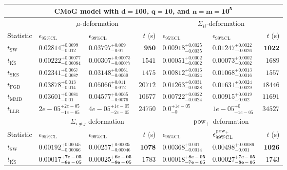 \begin{tabular}{l|llr|llr}
	\toprule
	\multicolumn{7}{c}{{\bf CMoG model with $\mathbf{d=100}$, $\mathbf{q=10}$, and $\mathbf{n=m=10^{5}}$}} \\
	\toprule
	\multicolumn{1}{c}{} & \multicolumn{3}{c}{$\mu$-deformation} & \multicolumn{3}{c}{$\Sigma_{ii}$-deformation} \\
	Statistic & $\epsilon_{95\%\mathrm{CL}}$ & $\epsilon_{99\%\mathrm    {CL}}$ & $t$ (s) & $\epsilon_{95\%\mathrm{CL}}$ & $\epsilon_{99\%\mathrm{CL}}$ & $t$ (s) \\
	\midrule
	$t_{\mathrm{SW}}$ & $0.02814_{-0.012}^{+0.0099}$ & $0.03797_{-0.01}^{+0.009}$ & ${\mathbf{950}}$ & $0.00918_{-0.0035}^{+0.0025}$ & $0.01247_{-0.0026}^{+0.0022}$ & ${\mathbf{1022}}$ \\
	$t_{\overline{\mathrm{KS}}}$ & ${\mathbf{0.00222_{-0.00084}^{+0.00077}}}$ & ${\mathbf{0.00307_{-0.00077}^{+0.00073}}}$ & $1541$ & ${\mathbf{0.00051_{-0.0002}^{+0.0002}}}$ & ${\mathbf{0.00073_{-0.0002}^{+0.0002}}}$ & $1689$ \\
	$t_{\mathrm{SKS}}$ & $0.02341_{-0.0087}^{+0.0067}$ & $0.03148_{-0.0069}^{+0.0061}$ & $1475$ & $0.00812_{-0.0024}^{+0.0016}$ & $0.01068_{-0.0016}^{+0.0013}$ & $1557$ \\
	$t_{\mathrm{FGD}}$ & $0.03878_{-0.014}^{+0.013}$ & $0.05066_{-0.012}^{+0.011}$ & $20712$ & $0.01263_{-0.0038}^{+0.0031}$ & $0.01631_{-0.0029}^{+0.0024}$ & $18446$ \\
	$t_{\mathrm{MMD}}$ & $0.03601_{-0.01}^{+0.0081}$ & $0.04577_{-0.0076}^{+0.0065}$ & $10677$ & $0.00722_{-0.0024}^{+0.0022}$ & $0.00915_{-0.002}^{+0.0019}$ & $11691$ \\
	$t_{\mathrm{LLR}}$ & $2e-05_{-1e-05}^{+2e-05}$ & $4e-05_{-2e-05}^{+1e-05}$ & $24750$ & $0.0_{-0}^{+1e-05}$ & $1e-05_{-1e-05}^{+0}$ & $34527$ \\
	\toprule
	\multicolumn{1}{c}{} & \multicolumn{3}{c}{$\Sigma_{i\neq j}$-deformation} & \multicolumn{3}{c}{$\rm{pow}_{+}$-deformation} \\
	Statistic & $\epsilon_{95\%\mathrm{CL}}$ & $\epsilon_{99\%\mathrm{CL}}$ & $t$ (s) & $\epsilon_{95\%\mathrm{CL}}$ & $\epsilon^{\rm   {pow}_{+}}_{99\%\mathrm{CL}}$ & $t$ (s) \\
	\midrule
	$t_{\mathrm{SW}}$ & $0.00192_{-0.00066}^{+0.00045}$ & $0.00257_{-0.00046}^{+0.00035}$ & ${\mathbf{1078}}$ & $0.00368_{-0.0014}^{+0.001}$ & $0.00498_{-0.001}^{+0.00086}$ & ${\mathbf{1026}}$ \\
	$t_{\overline{\mathrm{KS}}}$ & ${\mathbf{0.00017_{-8e-05}^{+7e-05}}}$ & ${\mathbf{0.00025_{-8e-05}^{+6e-05}}}$ & $1783$ & ${\mathbf{0.00018_{-7e-05}^{+8e-05}}}$ & ${\mathbf{0.00027_{-8e-05}^{+7e-05}}}$ & $1743$ \\

\end{tabular}
